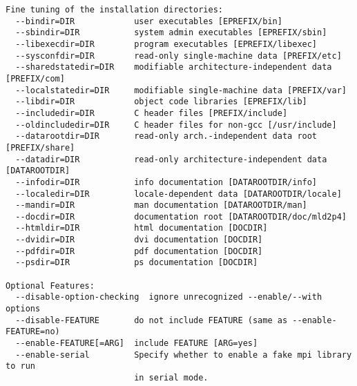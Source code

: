 \begin{verbatim}
Fine tuning of the installation directories:
  --bindir=DIR            user executables [EPREFIX/bin]
  --sbindir=DIR           system admin executables [EPREFIX/sbin]
  --libexecdir=DIR        program executables [EPREFIX/libexec]
  --sysconfdir=DIR        read-only single-machine data [PREFIX/etc]
  --sharedstatedir=DIR    modifiable architecture-independent data [PREFIX/com]
  --localstatedir=DIR     modifiable single-machine data [PREFIX/var]
  --libdir=DIR            object code libraries [EPREFIX/lib]
  --includedir=DIR        C header files [PREFIX/include]
  --oldincludedir=DIR     C header files for non-gcc [/usr/include]
  --datarootdir=DIR       read-only arch.-independent data root [PREFIX/share]
  --datadir=DIR           read-only architecture-independent data [DATAROOTDIR]
  --infodir=DIR           info documentation [DATAROOTDIR/info]
  --localedir=DIR         locale-dependent data [DATAROOTDIR/locale]
  --mandir=DIR            man documentation [DATAROOTDIR/man]
  --docdir=DIR            documentation root [DATAROOTDIR/doc/mld2p4]
  --htmldir=DIR           html documentation [DOCDIR]
  --dvidir=DIR            dvi documentation [DOCDIR]
  --pdfdir=DIR            pdf documentation [DOCDIR]
  --psdir=DIR             ps documentation [DOCDIR]

Optional Features:
  --disable-option-checking  ignore unrecognized --enable/--with options
  --disable-FEATURE       do not include FEATURE (same as --enable-FEATURE=no)
  --enable-FEATURE[=ARG]  include FEATURE [ARG=yes]
  --enable-serial         Specify whether to enable a fake mpi library to run
                          in serial mode.


\end{verbatim}
